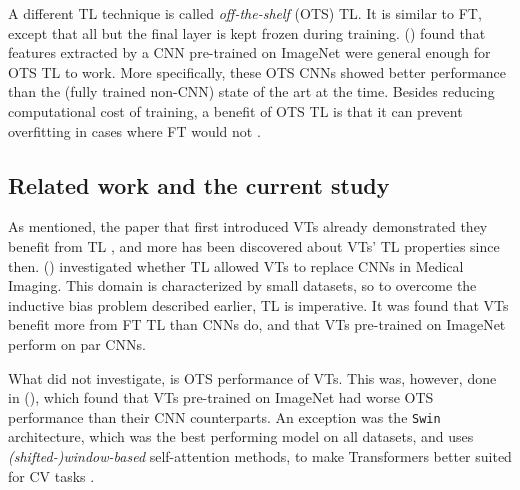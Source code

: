 
A different TL technique is called \textit{off-the-shelf} (OTS) TL. It is similar to FT, except that all but the final layer is kept frozen during training. \citeauthor{sharif2014cnn} (\citeyear{sharif2014cnn}) found that features extracted by a CNN pre-trained on ImageNet were general enough for OTS TL to work. More specifically, these OTS CNNs showed better performance than the (fully trained non-CNN) state of the art at the time. Besides reducing computational cost of training, a benefit of OTS TL is that it can prevent overfitting in cases where FT would not \citep{yosinski2014transferable}.


\subsection{Related work and the current study} \label{related_work}
As mentioned, the paper that first introduced VTs already demonstrated they benefit from TL \citep{dosovitskiy2020image}, and more has been discovered about VTs' TL properties since then. \citeauthor{matsoukas2021time} (\citeyear{matsoukas2021time}) investigated whether TL allowed VTs to replace CNNs in Medical Imaging. This domain is characterized by small datasets, so to overcome the inductive bias problem described earlier, TL is imperative. It was found that VTs benefit more from FT TL than CNNs do, and that VTs pre-trained on ImageNet perform on par CNNs.

What \citeauthor{matsoukas2021time} did not investigate, is OTS performance of VTs. This was, however, done in \citeauthor{zhou2021convnets} (\citeyear{zhou2021convnets}), which found that VTs pre-trained on ImageNet had worse OTS performance than their CNN counterparts. An exception was the \texttt{Swin} architecture, which was the best performing model on all datasets, and uses \textit{(shifted-)window-based} self-attention methods, to make Transformers better suited for CV tasks \citep{liu2021swin}.

